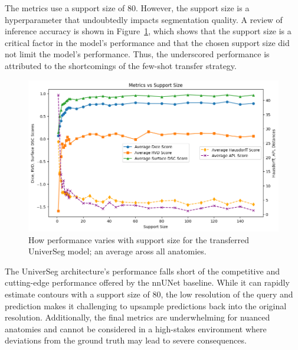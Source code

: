 \documentclass[11pt,twoside]{report}
\begin{document}
The metrics use a support size of 80. However, the support size is a hyperparameter that undoubtedly impacts segmentation quality. A review of inference accuracy is shown in Figure~\ref{fig:universeg-support-size}, which shows that the support size is a critical factor in the model's performance and that the chosen support size did not limit the model's performance. Thus, the underscored performance is attributed to the shortcomings of the few-shot transfer strategy.

\begin{figure}[H]
  \centering
  \includegraphics[width=.7\linewidth]{../../research/source/code/UniverSeg/support_size_metric_implications_universeg.png}
  \caption{How performance varies with support size for the transferred UniverSeg model; an average aross all anatomies.}\label{fig:universeg-support-size}
\end{figure}


The UniverSeg architecture's performance falls short of the competitive and cutting-edge performance offered by the nnUNet baseline. While it can rapidly estimate contours with a support size of 80, the low resolution of the query and prediction makes it challenging to upsample predictions back into the original resolution. Additionally, the final metrics are underwhelming for nuanced anatomies and cannot be considered in a high-stakes environment where deviations from the ground truth may lead to severe consequences.
\end{document}
